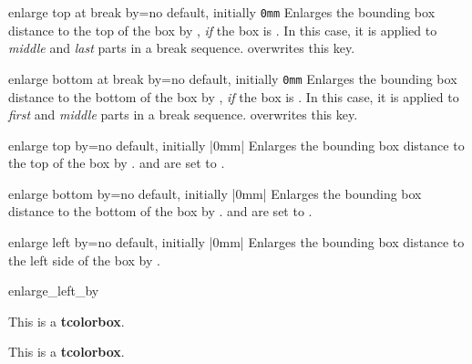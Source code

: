 \clearpage


\begin{docTcbKey}{enlarge top at break by}{=}{no default, initially \texttt{0mm}}
  Enlarges the bounding box distance to the top of the box by ,
  \emph{if} the box is .
  In this case, it is applied to \emph{middle} and \emph{last} parts in a
  break sequence.
   overwrites this key.
\end{docTcbKey}


\begin{docTcbKey}{enlarge bottom at break by}{=}{no default, initially \texttt{0mm}}
  Enlarges the bounding box distance to the bottom of the box by ,
  \emph{if} the box is .
  In this case, it is applied to \emph{first} and \emph{middle} parts in a
  break sequence.  overwrites this key.
\end{docTcbKey}


\begin{docTcbKey}{enlarge top by}{=}{no default, initially |0mm|}
  Enlarges the bounding box distance to the top of the box by .
   and
   are set to .
\end{docTcbKey}


\begin{docTcbKey}{enlarge bottom by}{=}{no default, initially |0mm|}
  Enlarges the bounding box distance to the bottom of the box by .
   and
   are set to .
\end{docTcbKey}


\begin{docTcbKey}{enlarge left by}{=}{no default, initially |0mm|}
  Enlarges the bounding box distance to the left side of the box by .
\begin{exdispExample}[safety=2cm]{enlarge_left_by}

\begin{tcolorbox}[enlarge left by=2cm,width=5cm,enhanced,show bounding box]
This is a \textbf{tcolorbox}.
\end{tcolorbox}
\begin{tcolorbox}[enlarge left by=-2cm,width=\linewidth+2cm]
This is a \textbf{tcolorbox}.
\end{tcolorbox}
\end{exdispExample}
\end{docTcbKey}

